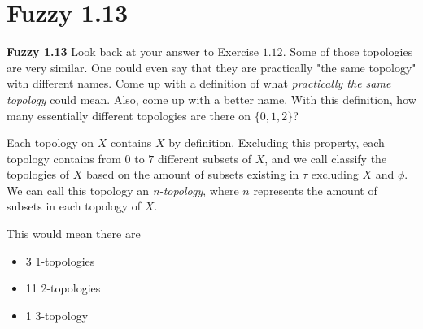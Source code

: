 \documentclass{report}
\begin{document}
\medskip

\section{Fuzzy 1.13}


\textbf{Fuzzy 1.13} Look back at your answer to Exercise $1.12$. Some of those topologies are very similar. One could even say that they are practically "the same topology" with different names. Come up with a definition of what \textit{practically the same topology} could mean. Also, come up with a better name. With this definition, how many essentially different topologies are there on $\{0, 1, 2\}$?

\medskip


\sol Each topology on $X$ contains $X$ by definition. Excluding this property, each topology contains from $0$ to $7$ different subsets of $X$, and we call classify the topologies of $X$ based on the amount of subsets existing in $\tau$ excluding $X$ and $\phi$. We can call this topology an \textit{n-topology}, where $n$ represents the amount of subsets in each topology of $X$. 



         This would mean there are 
\begin{center}
    \begin{itemize}
         \item 3 1-topologies
         \item 11 2-topologies
         \item 1 3-topology
    \end{itemize}
\end{center}
\medskip
\end{document}
